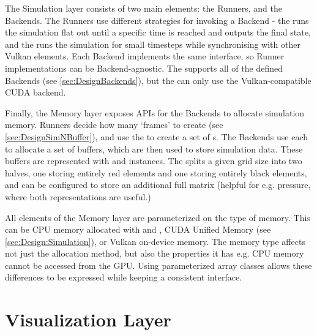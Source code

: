 The Simulation layer consists of two main elements: the Runners, and the Backends.
The Runners use different strategies for invoking a Backend - the  runs the simulation flat out until a specific time is reached and outputs the final state, and the  runs the simulation for small timesteps while synchronising with other Vulkan elements.
Each Backend implements the same interface, so Runner implementations can be Backend-agnostic.
The  supports all of the defined Backends (see \cref{sec:DesignBackends}), but the  can only use the Vulkan-compatible CUDA backend.

Finally, the Memory layer exposes APIs for the Backends to allocate simulation memory.
Runners decide how many `frames' to create (see \cref{sec:DesignSimNBuffer}), and use the  to create a set of s.
The Backends use each  to allocate a set of buffers, which are then used to store simulation data.
These buffers are represented with  and  instances.
The  splits a given grid size into two halves, one storing entirely red elements and one storing entirely black elements, and can be configured to store an additional full matrix (helpful for e.g. pressure, where both representations are useful.)

All elements of the Memory layer are parameterized on the type of memory.
This can be CPU memory allocated with  and , CUDA Unified Memory (see \cref{sec:Design:Simulation}), or Vulkan on-device memory. 
The memory type affects not just the allocation method, but also the properties it has e.g. CPU memory cannot be accessed from the GPU.
Using parameterized array classes allows these differences to be expressed while keeping a consistent interface.



\pagebreak
\section{Visualization Layer}



